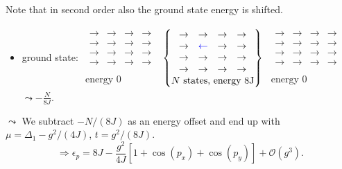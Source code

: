 \noindent Note that in second order also the ground state energy is shifted.
\begin{itemize}
\item ground state:
$\begin{matrix} 
\begin{matrix} \rightarrow & \rightarrow & \rightarrow & \rightarrow \\  \rightarrow & \rightarrow & \rightarrow & \rightarrow \\ \rightarrow & \rightarrow & \rightarrow & \rightarrow \\ \rightarrow & \rightarrow & \rightarrow & \rightarrow \\ \end{matrix} \\
\text{energy 0} \\
\end{matrix}$
$\begin{Bmatrix}
\begin{matrix} \rightarrow & \rightarrow & \rightarrow & \rightarrow \\  \rightarrow & \textcolor{blue}{\leftarrow} & \rightarrow & \rightarrow \\ \rightarrow & \rightarrow & \rightarrow & \rightarrow \\ \rightarrow & \rightarrow & \rightarrow & \rightarrow \\ \end{matrix}  \\
N\text{ states, energy 8J} \\
\end{Bmatrix}$
$\begin{matrix}
\begin{matrix} \rightarrow & \rightarrow & \rightarrow & \rightarrow \\  \rightarrow & \rightarrow & \rightarrow & \rightarrow \\ \rightarrow & \rightarrow & \rightarrow & \rightarrow \\ \rightarrow & \rightarrow & \rightarrow & \rightarrow \\ \end{matrix} \\
\text{energy 0} \\
\end{matrix}$
$\leadsto - \frac{N}{8J}$. \\
\end{itemize}

\noindent $\leadsto$ We subtract $-N/(8J)$ as an energy offset and end up with $\mu = \Delta_1 - g^2/(4J)$, $t = g^2/(8J)$. \\
\begin{equation}
\Rightarrow \epsilon_p = 8J - \frac{g^2}{4J}[1 + \cos(p_x) + \cos(p_y)] + \mathcal{O}(g^3). 
\end{equation}

